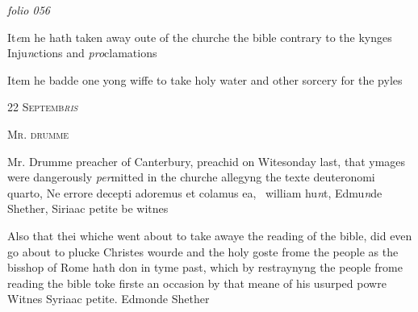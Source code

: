 \documentclass[12pt, a4paper]{book}
\begin{document}
\textit{folio 056}



				\marginpar[\vspace{0.5cm}{\textcolor{Gray}{Injunctions}}]{}
			 
		\ifthenelse{\isodd{\thepage}}
		{\reversemarginpar}
		{\normalmarginpar}
		It\textit{e}m he hath taken away oute of the churche the
 bible contrary to the kynges Inju\textit{n}ctions and \textit{pro}clamations
 
			 
		\ifthenelse{\isodd{\thepage}}
		{\reversemarginpar}
		{\normalmarginpar}
		Item he badde one yong wiffe to take holy water and
 other sorcery for the pyles
 

            
            
               
				\begin{center} \begin{large} {\scshape 
               	22 Septemb\textit{ris}
                  
               } \end{large} \end{center}
			
               
               	
				\begin{center}  {\scshape Mr. drumme}  \end{center}
			
               	
               		
				\marginpar[\vspace{0.5cm}{\textcolor{Gray}{Images}}]{}
			
               		
		\ifthenelse{\isodd{\thepage}}
		{\reversemarginpar}
		{\normalmarginpar}
		Mr. Drumme preacher of Canterbury, preachid on
 Witesonday last, that ymages were dangerously
 \textit{per}mitted in the churche allegyng the texte deuteronomi
 quarto, Ne errore decepti adoremus et colamus ea, 
               			william hu\textit{n}t, Edmu\textit{n}de Shether, Siriaac petite be
 witnes
               		
		\ifthenelse{\isodd{\thepage}}
		{\reversemarginpar}
		{\normalmarginpar}
		Also that thei whiche went about to take awaye
 the reading of the bible, did even go about to plucke
 Christes wourde and the holy goste frome the people
 as the bisshop of Rome hath don in tyme past, which
 by restraynyng the people frome reading the bible toke
 firste an occasion by that meane of his usurped powre
 Witnes Syriaac petite. Edmonde Shether
               		
\end{document}
